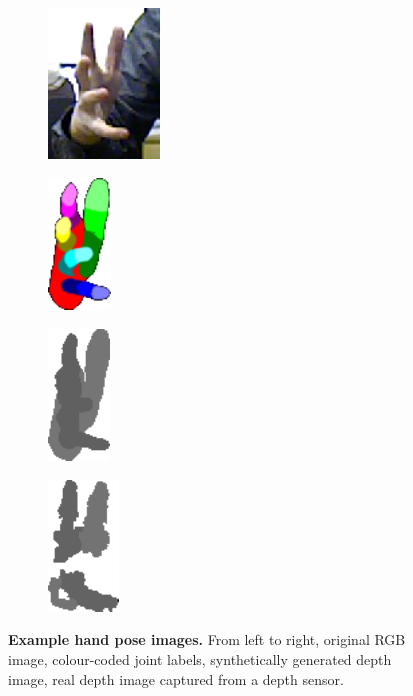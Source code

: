 \begin{figure}[th]
\centering
\begin{subfigure}[b]{0.22\linewidth}
	\centering
	\includegraphics[height=4cm]{fig/hand/fig1_rgb.png}
	\label{fig/hand/intro1}
\end{subfigure}
\begin{subfigure}[b]{0.22\linewidth}
	\centering
	\includegraphics[height=3.5cm]{fig/hand/fig1_a.png}
	\label{fig/hand/intro2}
\end{subfigure}
\begin{subfigure}[b]{0.22\linewidth}
	\centering
	\includegraphics[height=3.5cm]{fig/hand/fig1_c.png}
	\label{fig/hand/intro3}
\end{subfigure}
\begin{subfigure}[b]{0.22\linewidth}
	\centering
	\includegraphics[height=3.5cm]{fig/hand/fig1_b.png} 
	\label{fig/hand/intro4}
\end{subfigure}
\caption{\textbf{Example hand pose images.} From left to right, original RGB image, colour-coded joint labels, synthetically generated depth image, real depth image captured from a depth sensor.}
\label{fig/hand/intro}
\end{figure}

